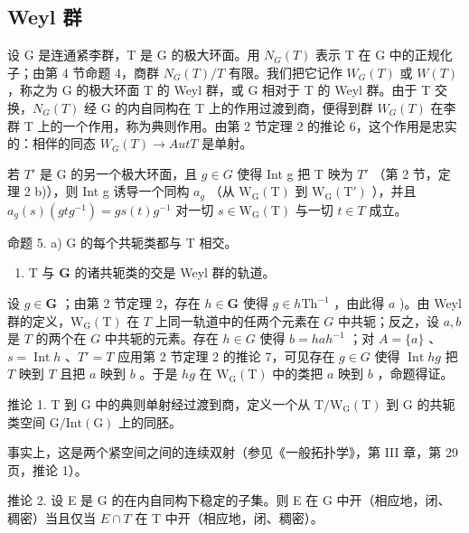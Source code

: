 \subsection{Weyl 群}

设 G 是连通紧李群，T 是 G 的极大环面。用 \(N_{G}(T)\) 表示 T 在 G 中的正规化子；由第 4 节命题 4，商群 \(N_{G}(T)/T\) 有限。我们把它记作 \(W_{G}(T)\) 或 \(W(T)\) ，称之为 G 的极大环面 T 的 Weyl 群，或 G 相对于 T 的 Weyl 群。由于 T 交换，\(N_{G}(T)\) 经 G 的内自同构在 T 上的作用过渡到商，便得到群 \(W_{G}(T)\) 在李群 T 上的一个作用，称为典则作用。由第 2 节定理 2 的推论 6，这个作用是忠实的：相伴的同态 \(W_{G}(T) \rightarrow Aut T\) 是单射。

若 \(T'\) 是 G 的另一个极大环面，且 \(g \in G\) 使得 Int g 把 T 映为 \(T'\) （第 2 节，定理 2 b)），则 Int g 诱导一个同构 \(a_g\) （从 \(\mathrm{W}_{\mathrm{G}}(\mathrm{T})\) 到 \(\mathrm{W}_{\mathrm{G}}(\mathrm{T}')\) ），并且 \(a_g(s)(gtg^{-1}) = gs(t)g^{-1}\) 对一切 \(s \in \mathrm{W}_{\mathrm{G}}(\mathrm{T})\) 与一切 \(t \in T\) 成立。

命题 5. a) G 的每个共轭类都与 T 相交。

\begin{enumerate}
\def\labelenumi{\alph{enumi})}
\setcounter{enumi}{1}
\tightlist
\item
  \(\mathrm{T}\) 与 \(\mathbf{G}\) 的诸共轭类的交是 Weyl 群的轨道。
\end{enumerate}

设 \(g \in \mathbf{G}\) ；由第 2 节定理 2，存在 \(h \in \mathbf{G}\) 使得 \(g \in h\mathrm{Th}^{-1}\) ，由此得 \(a\) )。由 Weyl 群的定义，\(\mathrm{W_G(T)}\) 在 \(T\) 上同一轨道中的任两个元素在 \(G\) 中共轭；反之，设 \(a, b\) 是 \(T\) 的两个在 \(G\) 中共轭的元素。存在 \(h \in G\) 使得 \(b = hah^{-1}\) ；对 \(A = \{a\}\) 、\(s = \operatorname{Int} h\) 、\(T' = T\) 应用第 2 节定理 2 的推论 7，可见存在 \(g \in G\) 使得 \(\operatorname{Int} hg\) 把 \(T\) 映到 \(T\) 且把 \(a\) 映到 \(b\) 。于是 \(hg\) 在 \(\mathrm{W_G(T)}\) 中的类把 \(a\) 映到 \(b\) ，命题得证。

推论 1. T 到 G 中的典则单射经过渡到商，定义一个从 \(\mathrm{T}/\mathrm{W}_{\mathrm{G}}(\mathrm{T})\) 到 G 的共轭类空间 \(\mathrm{G}/\mathrm{Int}(\mathrm{G})\) 上的同胚。

事实上，这是两个紧空间之间的连续双射（参见《一般拓扑学》，第 III 章，第 29 页，推论 1）。

推论 2. 设 E 是 G 的在内自同构下稳定的子集。则 E 在 G 中开（相应地，闭、稠密）当且仅当 \(E \cap T\) 在 T 中开（相应地，闭、稠密）。

